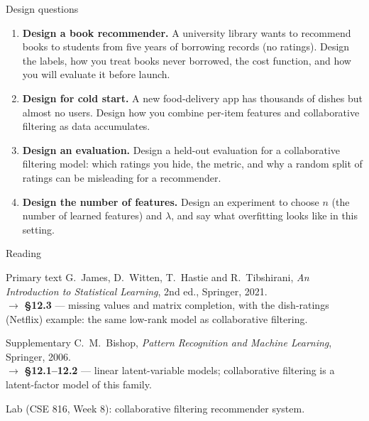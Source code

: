 \documentclass[aspectratio=169,10pt]{beamer}
\begin{document}
\begin{frame}{Design questions}
  \footnotesize
  \begin{enumerate}
    \item \textbf{Design a book recommender.} A university library wants to recommend
          books to students from five years of borrowing records (no ratings). Design the
          labels, how you treat books never borrowed, the cost function, and how you will
          evaluate it before launch. \hfill{}
    \item \textbf{Design for cold start.} A new food-delivery app has thousands of dishes
          but almost no users. Design how you combine per-item features and collaborative
          filtering as data accumulates. \hfill{}
    \item \textbf{Design an evaluation.} Design a held-out evaluation for a collaborative
          filtering model: which ratings you hide, the metric, and why a random split of
          ratings can be misleading for a recommender. \hfill{}
    \item \textbf{Design the number of features.} Design an experiment to choose $n$ (the
          number of learned features) and $\lambda$, and say what overfitting looks like
          in this setting. \hfill{}
  \end{enumerate}
\end{frame}

\begin{frame}{Reading}
  \begin{block}{Primary text}
    G.~James, D.~Witten, T.~Hastie and R.~Tibshirani,
    \emph{An Introduction to Statistical Learning}, 2nd ed., Springer, 2021.\\[2pt]
    \hfill{\small$\rightarrow$ \textbf{\S12.3} --- missing values and matrix completion,
    with the dish-ratings (Netflix) example: the same low-rank model as collaborative
    filtering.}
  \end{block}
  \begin{block}{Supplementary}
    C.~M.~Bishop, \emph{Pattern Recognition and Machine Learning}, Springer, 2006.\\[2pt]
    \hfill{\small$\rightarrow$ \textbf{\S12.1--12.2} --- linear latent-variable models;
    collaborative filtering is a latent-factor model of this family.}
  \end{block}
  \vspace{1mm}
  \begin{center}
    \small\color{cugray}
    Lab (CSE 816, Week 8): collaborative filtering recommender system.
  \end{center}
\end{frame}
\end{document}
